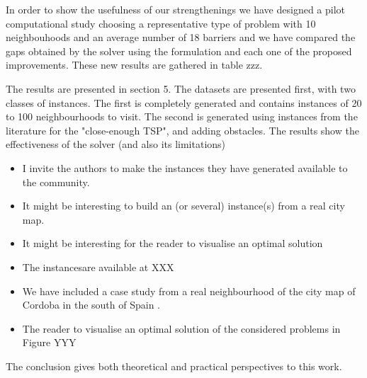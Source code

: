 \documentclass{article}
\newenvironment{reviewer}{\setcounter{pointcounter}{1}}{}
\newcommand{\point}{\text{{\selectfont \thepointcounter} \stepcounter{pointcounter}}}
\begin{document}
\begin{reviewer}
		\begin{tcolorbox}[breakable,enhanced,coltitle=black,colback=green!5!white,colframe=green!75!black,title=\textbf{Answer R2.\point},borderline={1pt}{0pt}{black},boxrule=0pt]
			In order to show the usefulness of our strengthenings we have designed a pilot computational study choosing a representative type of problem with 10 neighbouhoods and an average number of 18 barriers and we have compared the gaps obtained by the solver using the formulation and each one of the proposed improvements. These new results are gathered in table zzz.
		\end{tcolorbox}
		
		\begin{itshape}
			The results are presented in section 5. The datasets are presented first, with two classes of instances. The first is completely generated and contains instances of 20 to 100 neighbourhoods to visit. The second is generated using instances from the literature for the "close-enough TSP", and adding obstacles. The results show the effectiveness of the solver (and also its limitations)
			\begin{itemize}
			\item I invite the authors to make the instances they have generated available to the community.
			\item It might be interesting to build an (or several) instance(s) from a real city map.
			\item It might be interesting for the reader to visualise an optimal solution
			\end{itemize}
		\end{itshape}
		
		\begin{tcolorbox}[breakable,enhanced,coltitle=black,colback=green!5!white,colframe=green!75!black,title=\textbf{Answer R2.\point},borderline={1pt}{0pt}{black},boxrule=0pt]
		\begin{itemize}
			\item The instancesare available at XXX
			\item We have included a case study  from a real neighbourhood of the city map of Cordoba in the south of Spain .
			\item  The reader to visualise an optimal solution of the considered problems in Figure YYY
			\end{itemize}
			
		\end{tcolorbox}
		
		\begin{itshape}
			The conclusion gives both theoretical and practical perspectives to this work.
		\end{itshape}
		

\end{reviewer}
\end{document}
